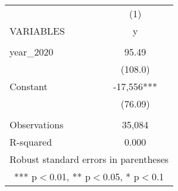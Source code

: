 \documentclass[]{article}
\begin{document}
\begin{tabular}{lc} \hline
 & (1) \\
VARIABLES & y \\ \hline
 &  \\
year\_2020 & 95.49 \\
 & (108.0) \\
Constant & -17,556*** \\
 & (76.09) \\
 &  \\
Observations & 35,084 \\
 R-squared & 0.000 \\ \hline
\multicolumn{2}{c}{ Robust standard errors in parentheses} \\
\multicolumn{2}{c}{ *** p$<$0.01, ** p$<$0.05, * p$<$0.1} \\
\end{tabular}
\end{document}
